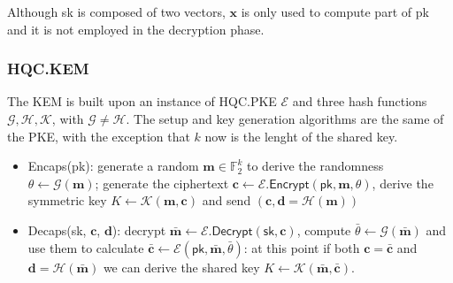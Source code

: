 Although \textsf{sk} is composed of two vectors, $\mathbf{x}$ is only used to compute part of \textsf{pk} and it is not employed in the decryption phase.

\subsubsection*{\textbf{\textsf{HQC.KEM}}}
The KEM is built upon an instance of \textsf{HQC.PKE} $\mathcal{E}$ and three hash functions $\mathcal{G}, \mathcal{H}, \mathcal{K}$, with $\mathcal{G} \neq \mathcal{H}$.
The setup and key generation algorithms are the same of the PKE, with the exception that $k$ now is the lenght of the shared key.
\begin{itemize}
  \item \textsf{Encaps}(\textsf{pk}): generate a random $\mathbf{m} \in \mathds{F}_2^k$ to derive the randomness $\theta \leftarrow \mathcal{G}(\mathbf{m})$; 
  generate the ciphertext $\mathbf{c} \leftarrow \mathcal{E}.\textsf{Encrypt}(\textsf{pk}, \mathbf{m}, \theta)$, derive the symmetric key $K \leftarrow \mathcal{K}(\mathbf{m}, \mathbf{c})$
    and send $(\mathbf{c}, \mathbf{d} = \mathcal{H}(\mathbf{m}))$
  \item \textsf{Decaps}(\textsf{sk}, $\mathbf{c}$, $\mathbf{d}$): decrypt $\mathbf{\bar{m}} \leftarrow \mathcal{E}.\textsf{Decrypt}(\textsf{sk}, \mathbf{c})$, compute $\bar{\theta} \leftarrow \mathcal{G}(\mathbf{\bar{m}})$ and use them to calculate 
  $\mathbf{\bar{c}} \leftarrow \mathcal{E}(\textsf{pk}, \mathbf{\bar{m}}, \bar{\theta})$: at this point if both $\mathbf{c} = \mathbf{\bar{c}}$ and $\mathbf{d} = \mathcal{H}(\mathbf{\bar{m}})$
    we can derive the shared key $K \leftarrow \mathcal{K}(\mathbf{\bar{m}}, \mathbf{\bar{c}})$. 
\end{itemize}
